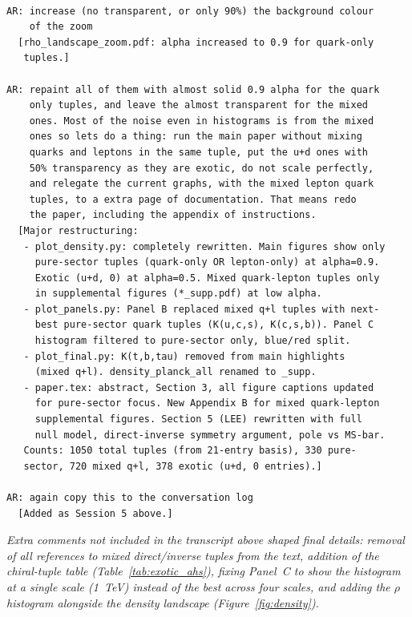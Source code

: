\documentclass[11pt,a4paper]{article}
\begin{document}
\begin{Verbatim}[fontsize=\footnotesize]
% === SESSION 5: Pure-sector restructuring (2026-03-10) ===

AR: increase (no transparent, or only 90%) the background colour
    of the zoom
  [rho_landscape_zoom.pdf: alpha increased to 0.9 for quark-only
   tuples.]

AR: repaint all of them with almost solid 0.9 alpha for the quark
    only tuples, and leave the almost transparent for the mixed
    ones. Most of the noise even in histograms is from the mixed
    ones so lets do a thing: run the main paper without mixing
    quarks and leptons in the same tuple, put the u+d ones with
    50% transparency as they are exotic, do not scale perfectly,
    and relegate the current graphs, with the mixed lepton quark
    tuples, to a extra page of documentation. That means redo
    the paper, including the appendix of instructions.
  [Major restructuring:
   - plot_density.py: completely rewritten. Main figures show only
     pure-sector tuples (quark-only OR lepton-only) at alpha=0.9.
     Exotic (u+d, 0) at alpha=0.5. Mixed quark-lepton tuples only
     in supplemental figures (*_supp.pdf) at low alpha.
   - plot_panels.py: Panel B replaced mixed q+l tuples with next-
     best pure-sector quark tuples (K(u,c,s), K(c,s,b)). Panel C
     histogram filtered to pure-sector only, blue/red split.
   - plot_final.py: K(t,b,tau) removed from main highlights
     (mixed q+l). density_planck_all renamed to _supp.
   - paper.tex: abstract, Section 3, all figure captions updated
     for pure-sector focus. New Appendix B for mixed quark-lepton
     supplemental figures. Section 5 (LEE) rewritten with full
     null model, direct-inverse symmetry argument, pole vs MS-bar.
   Counts: 1050 total tuples (from 21-entry basis), 330 pure-
   sector, 720 mixed q+l, 378 exotic (u+d, 0 entries).]

AR: again copy this to the conversation log
  [Added as Session 5 above.]
\end{Verbatim}

\medskip
\noindent\textit{Extra comments not included in the transcript above
shaped final details: removal of all references to mixed direct/inverse
tuples from the text, addition of the chiral-tuple table
(Table~\ref{tab:exotic_ahs}), fixing Panel~C to show the histogram
at a single scale (1~TeV) instead of the best across four scales,
and adding the $\rho$ histogram alongside the density landscape
(Figure~\ref{fig:density}).}

\end{document}
